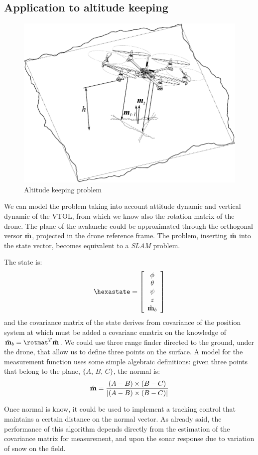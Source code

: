 \subsection{Application to altitude keeping}
\begin{figure}[h]
	\centering
	\includegraphics[scale=0.65]{ch3/img/altitude_keep.pdf}
	\caption{Altitude keeping problem}
	\forceversofloat
\end{figure}
\FloatBarrier
We can model the problem taking into account attitude dynamic and vertical dynamic of the VTOL, from which we know also the rotation matrix of the drone. The plane of the avalanche could be approximated through the orthogonal versor $\hat{\mathbf{m}}$, projected in the drone reference frame. The problem, inserting $\hat{\mathbf{m}}$ into the state vector, becomes equivalent to a \emph{SLAM} problem.

The state is:
\renewcommand{\arraystretch}{1}
\begin{equation}
\hexastate = \vettore{\phi\\\theta\\\psi\\z\\\vers{m}_b}
\end{equation}
\renewcommand{\arraystretch}{1.75}
and the covariance matrix of the state derives from covariance of the position system at which must be added a covarianc ematrix on the knowledge of ${\vers{m}_b = \rotmat^{T} \vers{m}}$. We could use three range finder directed to the ground, under the drone, that allow us to define three points on the surface. A model for the measurement function uses some simple algebraic definitions: given three points that belong to the plane, $\{A,\, B,\, C\}$, the normal is:
\begin{equation}
\hat{\mathbf{m}} = \dfrac{(A-B)\times(B-C)}{\left| (A-B)\times(B-C) \right|}
\end{equation}

Once normal is know, it could be used to implement a tracking control that maintains a certain distance on the normal vector. As already said, the performance of this algorithm depends directly from the estimation of the covariance matrix for measurement, and upon the sonar response due to variation of snow on the field.
